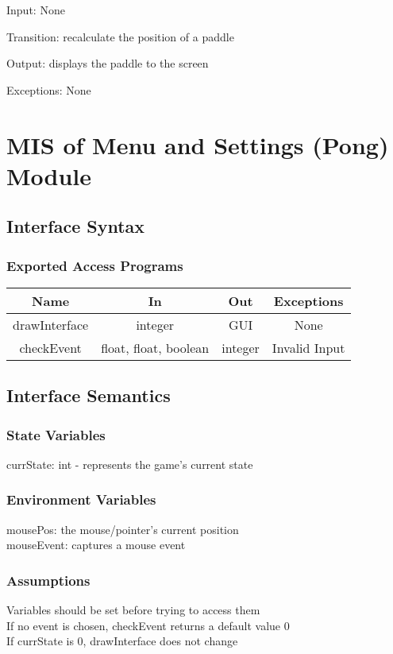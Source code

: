 \documentclass[12pt, titlepage]{article}
\begin{document}
		Input: None
		
		Transition: recalculate the position of a paddle
		
		Output: displays the paddle to the screen
		
		Exceptions: None
		
\section{MIS of Menu and Settings (Pong) Module}
		\subsection{Interface Syntax}
		\subsubsection{Exported Access Programs}
		\begin{tabular}[pos]{|c|c|c|c|}
			\hline
			\textbf{Name}& \textbf{In} & \textbf{Out} & \textbf{Exceptions} \\ \hline
			drawInterface & integer & GUI & None \\ \hline
			checkEvent & float, float, boolean & integer & Invalid Input \\ \hline
			
		\end{tabular}
		
		\subsection{Interface Semantics}
		\subsubsection{State Variables}
		currState: int - represents the game's current state
		
		\subsubsection{Environment Variables}
		mousePos: the mouse/pointer's current position\\
		mouseEvent: captures a mouse event 
		\subsubsection{Assumptions}
		Variables should be set before trying to access them \\ 
		If no event is chosen, checkEvent returns a default value 0 \\
		If currState is 0, drawInterface does not change \\
		
\end{document}
